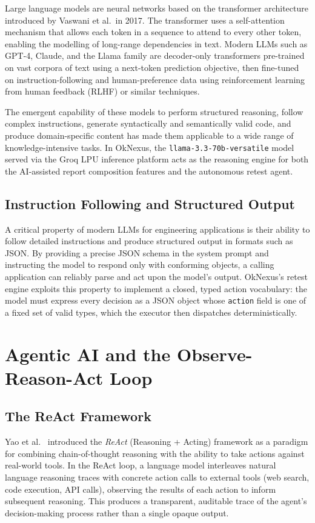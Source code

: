 Large language models are neural networks based on the transformer architecture introduced by Vaswani et al.\ in 2017. The transformer uses a self-attention mechanism that allows each token in a sequence to attend to every other token, enabling the modelling of long-range dependencies in text. Modern LLMs such as GPT-4, Claude, and the Llama family are decoder-only transformers pre-trained on vast corpora of text using a next-token prediction objective, then fine-tuned on instruction-following and human-preference data using reinforcement learning from human feedback (RLHF) or similar techniques.

The emergent capability of these models to perform structured reasoning, follow complex instructions, generate syntactically and semantically valid code, and produce domain-specific content has made them applicable to a wide range of knowledge-intensive tasks. In OkNexus, the \texttt{llama-3.3-70b-versatile} model served via the Groq LPU inference platform acts as the reasoning engine for both the AI-assisted report composition features and the autonomous retest agent.

\subsection{Instruction Following and Structured Output}

A critical property of modern LLMs for engineering applications is their ability to follow detailed instructions and produce structured output in formats such as JSON. By providing a precise JSON schema in the system prompt and instructing the model to respond only with conforming objects, a calling application can reliably parse and act upon the model's output. OkNexus's retest engine exploits this property to implement a closed, typed action vocabulary: the model must express every decision as a JSON object whose \texttt{action} field is one of a fixed set of valid types, which the executor then dispatches deterministically.

\section{Agentic AI and the Observe-Reason-Act Loop}

\subsection{The ReAct Framework}

Yao et al.\ \cite{react2023} introduced the \textit{ReAct} (Reasoning + Acting) framework as a paradigm for combining chain-of-thought reasoning with the ability to take actions against real-world tools. In the ReAct loop, a language model interleaves natural language reasoning traces with concrete action calls to external tools (web search, code execution, API calls), observing the results of each action to inform subsequent reasoning. This produces a transparent, auditable trace of the agent's decision-making process rather than a single opaque output.

